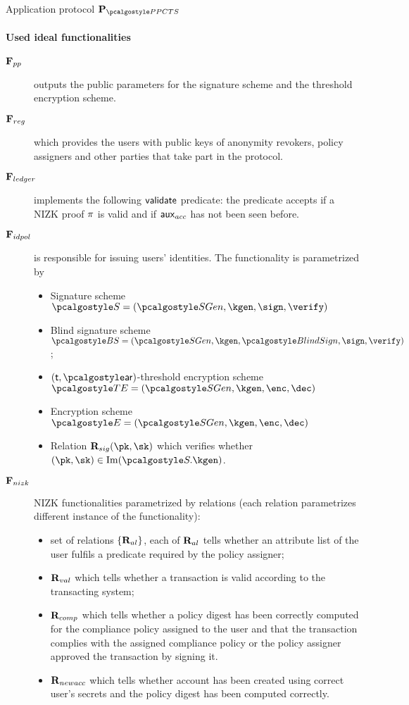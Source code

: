 \documentclass[runningheads,10pt]{llncs}
\numberwithin{equation}{section}
\begin{document}
\begin{protbox}{Application protocol $\prot{\PPCTS}$}
  \paragraph{Used ideal functionalities}
  \begin{description}
  \item[$\mathbf{F}_{{pp}}$] outputs the public parameters for the signature scheme and the
    threshold encryption scheme.
  \item[$\mathbf{F}_{{reg}}$] which provides the users with public keys of anonymity
    revokers, policy assigners and other parties that take part in the protocol.
  \item[$\mathbf{F}_{{ledger}}$] implements the following $\mathsf{validate}$
    predicate: the predicate accepts if a NIZK proof $\mathsf{\pi}$ is valid and if
    $\mathsf{aux}_{acc}$ has not been seen before.
  \item[$\mathbf{F}_{{idpol}}$] is responsible for issuing users' identities. The functionality
    is parametrized by
    \begin{itemize}
    \item Signature scheme $\SIG = (\sgen, \kgen, \sign, \verify)$
    \item Blind signature scheme
      $\BSIG = (\sgen, \kgen, \blindsign, \sign, \verify)$;
    \item $(\thresholdar, \noofar)$-threshold encryption scheme $\TENC = (\sgen, \kgen, \enc, \dec)$
    \item Encryption scheme $\ENC = (\sgen, \kgen, \enc, \dec)$
    \item Relation $\REL_{sig}(\pk, \sk)$ which verifies whether
      $(\pk, \sk) \in \IM(\SIG.\kgen)$.
    \end{itemize}
  \item[$\mathbf{F}_{{nizk}}$] NIZK functionalities parametrized by relations (each
    relation parametrizes different instance of the functionality):
    \begin{itemize}
    \item set of relations $\{\mathbf{R}_{al}\}$, each of $\mathbf{R}_{al}$ tells whether an
      attribute list of the user fulfils a predicate required by the policy assigner;
    \item$\mathbf{R}_{val}$ which tells whether a transaction is valid according to the
      transacting system;
    \item$\mathbf{R}_{comp}$ which tells whether a policy digest has been correctly
      computed for the compliance policy assigned to the user and that the
      transaction complies with the assigned compliance policy or the policy
      assigner approved the transaction by signing it.
    \item$\mathbf{R}_{newacc}$ which tells whether account has been created using
      correct user's secrets and the policy digest has been computed correctly.
    \end{itemize}
  \end{description}


\end{protbox}
\end{document}
